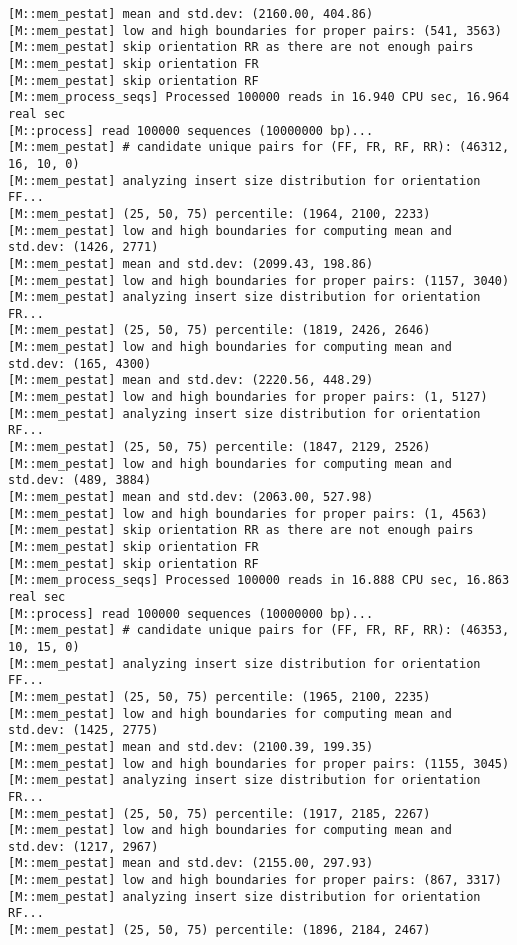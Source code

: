 \begin{lstlisting}
[M::mem_pestat] mean and std.dev: (2160.00, 404.86)
[M::mem_pestat] low and high boundaries for proper pairs: (541, 3563)
[M::mem_pestat] skip orientation RR as there are not enough pairs
[M::mem_pestat] skip orientation FR
[M::mem_pestat] skip orientation RF
[M::mem_process_seqs] Processed 100000 reads in 16.940 CPU sec, 16.964 real sec
[M::process] read 100000 sequences (10000000 bp)...
[M::mem_pestat] # candidate unique pairs for (FF, FR, RF, RR): (46312, 16, 10, 0)
[M::mem_pestat] analyzing insert size distribution for orientation FF...
[M::mem_pestat] (25, 50, 75) percentile: (1964, 2100, 2233)
[M::mem_pestat] low and high boundaries for computing mean and std.dev: (1426, 2771)
[M::mem_pestat] mean and std.dev: (2099.43, 198.86)
[M::mem_pestat] low and high boundaries for proper pairs: (1157, 3040)
[M::mem_pestat] analyzing insert size distribution for orientation FR...
[M::mem_pestat] (25, 50, 75) percentile: (1819, 2426, 2646)
[M::mem_pestat] low and high boundaries for computing mean and std.dev: (165, 4300)
[M::mem_pestat] mean and std.dev: (2220.56, 448.29)
[M::mem_pestat] low and high boundaries for proper pairs: (1, 5127)
[M::mem_pestat] analyzing insert size distribution for orientation RF...
[M::mem_pestat] (25, 50, 75) percentile: (1847, 2129, 2526)
[M::mem_pestat] low and high boundaries for computing mean and std.dev: (489, 3884)
[M::mem_pestat] mean and std.dev: (2063.00, 527.98)
[M::mem_pestat] low and high boundaries for proper pairs: (1, 4563)
[M::mem_pestat] skip orientation RR as there are not enough pairs
[M::mem_pestat] skip orientation FR
[M::mem_pestat] skip orientation RF
[M::mem_process_seqs] Processed 100000 reads in 16.888 CPU sec, 16.863 real sec
[M::process] read 100000 sequences (10000000 bp)...
[M::mem_pestat] # candidate unique pairs for (FF, FR, RF, RR): (46353, 10, 15, 0)
[M::mem_pestat] analyzing insert size distribution for orientation FF...
[M::mem_pestat] (25, 50, 75) percentile: (1965, 2100, 2235)
[M::mem_pestat] low and high boundaries for computing mean and std.dev: (1425, 2775)
[M::mem_pestat] mean and std.dev: (2100.39, 199.35)
[M::mem_pestat] low and high boundaries for proper pairs: (1155, 3045)
[M::mem_pestat] analyzing insert size distribution for orientation FR...
[M::mem_pestat] (25, 50, 75) percentile: (1917, 2185, 2267)
[M::mem_pestat] low and high boundaries for computing mean and std.dev: (1217, 2967)
[M::mem_pestat] mean and std.dev: (2155.00, 297.93)
[M::mem_pestat] low and high boundaries for proper pairs: (867, 3317)
[M::mem_pestat] analyzing insert size distribution for orientation RF...
[M::mem_pestat] (25, 50, 75) percentile: (1896, 2184, 2467)

\end{lstlisting}
